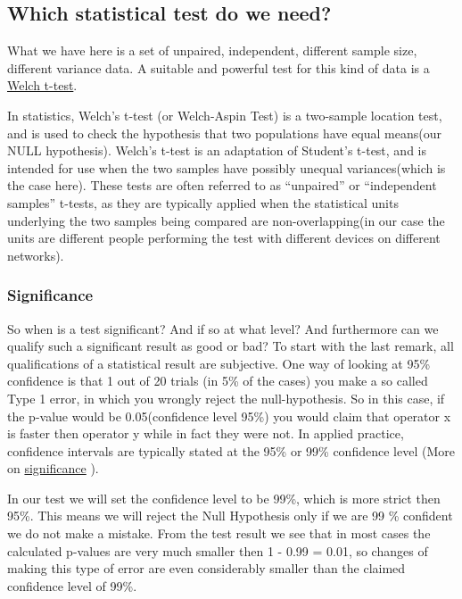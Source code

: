 \documentclass[]{article}
\begin{document}
\subsection{Which statistical test do we
need?}\label{which-statistical-test-do-we-need}

What we have here is a set of unpaired, independent, different sample
size, different variance data. A suitable and powerful test for this
kind of data is a
\href{https://en.wikipedia.org/wiki/Welch\%27s_t_test}{Welch t-test}.

In statistics, Welch's t-test (or Welch-Aspin Test) is a two-sample
location test, and is used to check the hypothesis that two populations
have equal means(our NULL hypothesis). Welch's t-test is an adaptation
of Student's t-test, and is intended for use when the two samples have
possibly unequal variances(which is the case here). These tests are
often referred to as ``unpaired'' or ``independent samples'' t-tests, as
they are typically applied when the statistical units underlying the two
samples being compared are non-overlapping(in our case the units are
different people performing the test with different devices on different
networks).

\subsubsection{Significance}\label{significance}

So when is a test significant? And if so at what level? And furthermore
can we qualify such a significant result as good or bad? To start with
the last remark, all qualifications of a statistical result are
subjective. One way of looking at 95\% confidence is that 1 out of 20
trials (in 5\% of the cases) you make a so called Type 1 error, in which
you wrongly reject the null-hypothesis. So in this case, if the p-value
would be 0.05(confidence level 95\%) you would claim that operator x is
faster then operator y while in fact they were not. In applied practice,
confidence intervals are typically stated at the 95\% or 99\% confidence
level (More on
\href{https://en.wikipedia.org/wiki/Statistical_significance}{significance}
).

In our test we will set the confidence level to be 99\%, which is more
strict then 95\%. This means we will reject the Null Hypothesis only if
we are 99 \% confident we do not make a mistake. From the test result we
see that in most cases the calculated p-values are very much smaller
then 1 - 0.99 = 0.01, so changes of making this type of error are even
considerably smaller than the claimed confidence level of 99\%.
\end{document}
